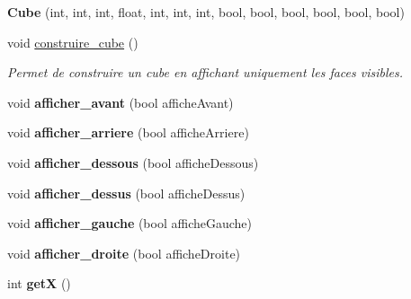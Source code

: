 \begin{DoxyCompactItemize}
\item 
\hypertarget{classCube_aff3bf4c9ea1a38e10c646aa39d363eca}{{\bfseries Cube} (int, int, int, float, int, int, int, bool, bool, bool, bool, bool, bool)}\label{classCube_aff3bf4c9ea1a38e10c646aa39d363eca}

\item 
\hypertarget{classCube_aa04ef7154adc3feefa0ebb09f3628f37}{void \hyperlink{classCube_aa04ef7154adc3feefa0ebb09f3628f37}{construire\-\_\-cube} ()}\label{classCube_aa04ef7154adc3feefa0ebb09f3628f37}

\begin{DoxyCompactList}\small\item\em Permet de construire un cube en affichant uniquement les faces visibles. \end{DoxyCompactList}\item 
\hypertarget{classCube_ac39c5f7f1fdc8ee24546782c67da73ae}{void {\bfseries afficher\-\_\-avant} (bool affiche\-Avant)}\label{classCube_ac39c5f7f1fdc8ee24546782c67da73ae}

\item 
\hypertarget{classCube_ac7a896d3041c09dc2e0554e9e26b5ca1}{void {\bfseries afficher\-\_\-arriere} (bool affiche\-Arriere)}\label{classCube_ac7a896d3041c09dc2e0554e9e26b5ca1}

\item 
\hypertarget{classCube_a2628233ae02c22edc27063894a861389}{void {\bfseries afficher\-\_\-dessous} (bool affiche\-Dessous)}\label{classCube_a2628233ae02c22edc27063894a861389}

\item 
\hypertarget{classCube_aa1bcd3527d9fe2006ba467c3a5d2040a}{void {\bfseries afficher\-\_\-dessus} (bool affiche\-Dessus)}\label{classCube_aa1bcd3527d9fe2006ba467c3a5d2040a}

\item 
\hypertarget{classCube_a468f17645009f9dd36906bfde0ee4c8b}{void {\bfseries afficher\-\_\-gauche} (bool affiche\-Gauche)}\label{classCube_a468f17645009f9dd36906bfde0ee4c8b}

\item 
\hypertarget{classCube_ad4973e18267f1d452fd49829bb370b3d}{void {\bfseries afficher\-\_\-droite} (bool affiche\-Droite)}\label{classCube_ad4973e18267f1d452fd49829bb370b3d}

\item 
\hypertarget{classCube_a533025489332814204d81a90672741df}{int {\bfseries get\-X} ()}\label{classCube_a533025489332814204d81a90672741df}


\end{DoxyCompactItemize}
